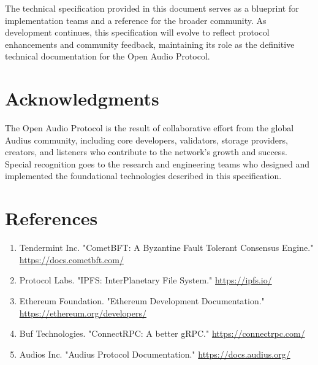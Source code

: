 \documentclass[11pt,a4paper]{article}
\begin{document}
The technical specification provided in this document serves as a blueprint for implementation teams and a reference for the broader community. As development continues, this specification will evolve to reflect protocol enhancements and community feedback, maintaining its role as the definitive technical documentation for the Open Audio Protocol.

\section*{Acknowledgments}

The Open Audio Protocol is the result of collaborative effort from the global Audius community, including core developers, validators, storage providers, creators, and listeners who contribute to the network's growth and success. Special recognition goes to the research and engineering teams who designed and implemented the foundational technologies described in this specification.

\section*{References}

\begin{enumerate}
  \item Tendermint Inc. "CometBFT: A Byzantine Fault Tolerant Consensus Engine." \url{https://docs.cometbft.com/}
  \item Protocol Labs. "IPFS: InterPlanetary File System." \url{https://ipfs.io/}
  \item Ethereum Foundation. "Ethereum Development Documentation." \url{https://ethereum.org/developers/}
  \item Buf Technologies. "ConnectRPC: A better gRPC." \url{https://connectrpc.com/}
  \item Audios Inc. "Audius Protocol Documentation." \url{https://docs.audius.org/}
\end{enumerate}
\end{document}
